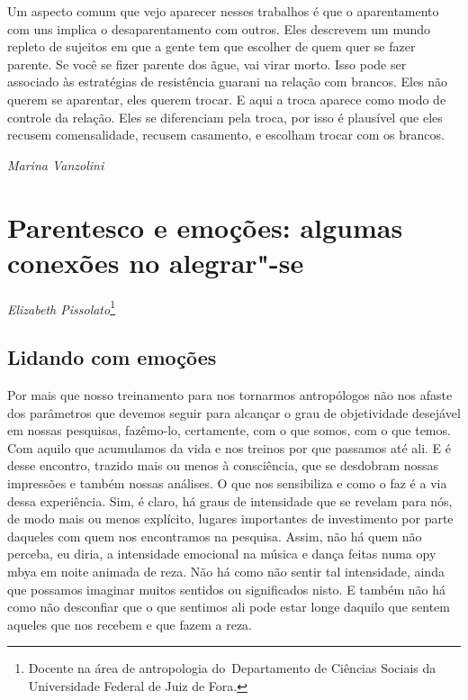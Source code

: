 Um aspecto comum que vejo aparecer nesses trabalhos é que o
aparentamento com uns implica o desaparentamento com outros. Eles
descrevem um mundo repleto de sujeitos em que a gente tem que escolher
de quem quer se fazer parente. Se você se fizer parente dos ãgue, vai
virar morto. Isso pode ser associado às estratégias de resistência
guarani na relação com brancos. Eles não querem se aparentar, eles
querem trocar. E aqui a troca aparece como modo de controle da relação.
Eles se diferenciam pela troca, por isso é plausível que eles recusem
comensalidade, recusem casamento, e escolham trocar com os brancos.
\medskip
\begin{flushright}
\emph{Marina Vanzolini}
\end{flushright}

\chapter{Parentesco e emoções: algumas conexões no
alegrar"-se}
\begin{flushright}
\emph{Elizabeth Pissolato}\footnote{Docente na área de antropologia
do~Departamento de Ciências Sociais da Universidade Federal de Juiz de
Fora.}
\end{flushright}

\section{Lidando com emoções}

Por mais que nosso treinamento para nos tornarmos antropólogos não nos
afaste dos parâmetros que devemos seguir para alcançar o grau de
objetividade desejável em nossas pesquisas, fazêmo-lo, certamente, com
o que somos, com o que temos. Com aquilo que acumulamos da vida e nos
treinos por que passamos até ali. E é desse encontro, trazido mais ou
menos à consciência, que se desdobram nossas impressões e também nossas
análises. O que nos sensibiliza e como o faz é a via dessa experiência.
Sim, é claro, há graus de intensidade que se revelam para nós, de modo
mais ou menos explícito, lugares importantes de investimento por parte
daqueles com quem nos encontramos na pesquisa. Assim, não há quem não
perceba, eu diria, a intensidade emocional na música e dança feitas
numa opy mbya em noite animada de reza. Não há como não sentir tal
intensidade, ainda que possamos imaginar muitos sentidos ou
significados nisto. E também não há como não desconfiar que o que
sentimos ali pode estar longe daquilo que sentem aqueles que nos
recebem e que fazem a reza.

